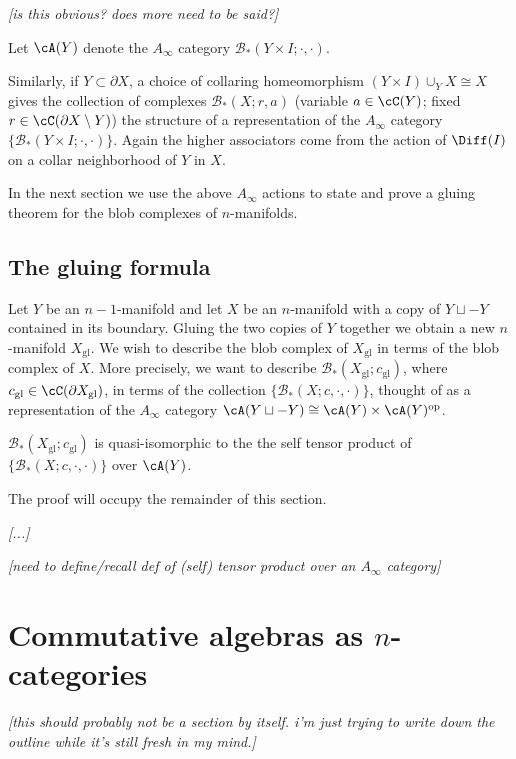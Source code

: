 \documentclass[11pt,leqno]{amsart}
\def\bc{{\mathcal B}}
\def\du{\sqcup}
\def\bd{\partial}
\def\sub{\subset}
\def\setmin{\setminus}
\def\sgl{_\mathrm{gl}}
\def\op{^\mathrm{op}}
\def\nn#1{{{\it \small [#1]}}}
\begin{document}
\nn{is this obvious?  does more need to be said?}

Let $\cA(Y)$ denote the $A_\infty$ category $\bc_*(Y\times I; \cdot, \cdot)$.

Similarly, if $Y \sub \bd X$, a choice of collaring homeomorphism
$(Y\times I) \cup_Y X \cong X$ gives the collection of complexes $\bc_*(X; r, a)$
(variable $a \in \cC(Y)$; fixed $r \in \cC(\bd X \setmin Y)$) the structure of a representation of the
$A_\infty$ category $\{\bc_*(Y\times I; \cdot, \cdot)\}$.
Again the higher associators come from the action of $\Diff(I)$ on a collar neighborhood
of $Y$ in $X$.

In the next section we use the above $A_\infty$ actions to state and prove
a gluing theorem for the blob complexes of $n$-manifolds.


\subsection{The gluing formula}
\label{sec:gluing-formula}%
Let $Y$ be an $n{-}1$-manifold and let $X$ be an $n$-manifold with a copy
of $Y \du -Y$ contained in its boundary.
Gluing the two copies of $Y$ together we obtain a new $n$-manifold $X\sgl$.
We wish to describe the blob complex of $X\sgl$ in terms of the blob complex
of $X$.
More precisely, we want to describe $\bc_*(X\sgl; c\sgl)$,
where $c\sgl \in \cC(\bd X\sgl)$,
in terms of the collection $\{\bc_*(X; c, \cdot, \cdot)\}$, thought of as a representation
of the $A_\infty$ category $\cA(Y\du-Y) \cong \cA(Y)\times \cA(Y)\op$.

\begin{thm}
$\bc_*(X\sgl; c\sgl)$ is quasi-isomorphic to the the self tensor product
of $\{\bc_*(X; c, \cdot, \cdot)\}$ over $\cA(Y)$.
\end{thm}

The proof will occupy the remainder of this section.

\nn{...}

\bigskip

\nn{need to define/recall def of (self) tensor product over an $A_\infty$ category}


\section{Commutative algebras as $n$-categories}

\nn{this should probably not be a section by itself.  i'm just trying to write down the outline 
while it's still fresh in my mind.}
\end{document}
